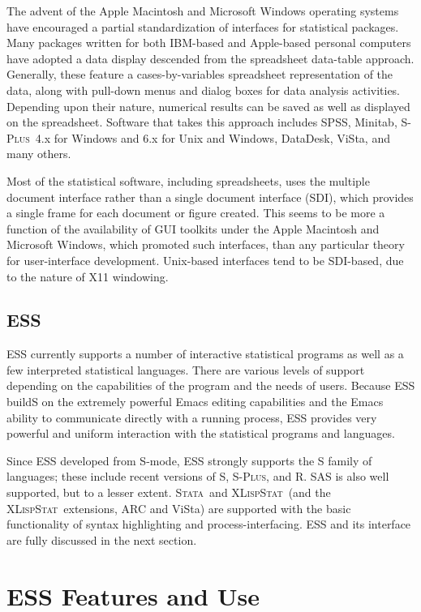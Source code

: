 \documentclass{article}
\newcommand*{\Splus}{\textsc{S-Plus}}
\newcommand*{\XLispStat}{\textsc{XLispStat}}
\newcommand*{\Stata}{\textsc{Stata}}
\begin{document}
The advent of the Apple Macintosh and Microsoft Windows operating
systems have encouraged a partial standardization of interfaces for
statistical packages.  Many packages written for both IBM-based and
Apple-based personal computers have adopted a data display descended
from the spreadsheet data-table approach.  Generally, these feature a
cases-by-variables spreadsheet representation of the data, along with
pull-down menus and dialog boxes for data analysis activities.
Depending upon their nature, numerical results can be saved as well as
displayed on the spreadsheet.  Software that takes this approach
includes SPSS, Minitab, \Splus\ 4.x for Windows and 6.x for Unix and
Windows, DataDesk, ViSta, and many others.

Most of the statistical software, including spreadsheets, uses the
multiple document interface rather than a single document interface
(SDI), which provides a single frame for each document or figure
created.  This seems to be more a function of the availability of GUI
toolkits under the Apple Macintosh and Microsoft Windows, which
promoted such interfaces, than any particular theory for
user-interface development.  Unix-based interfaces tend to be
SDI-based, due to the nature of X11 windowing.

\subsection{ESS}
\label{sec:UI:ESS}

ESS currently supports a number of interactive statistical programs as
well as a few interpreted statistical languages.  There are various
levels of support depending on the capabilities of the program and the
needs of users.  Because ESS buildS on the extremely powerful Emacs
editing capabilities and the Emacs ability to communicate directly
with a running process, ESS provides very powerful and uniform
interaction with the statistical programs and languages.

Since ESS developed from S-mode, ESS strongly supports the S family of
languages; these include recent versions of S, \Splus, and R.  SAS is
also well supported, but to a lesser extent.  \Stata\ and \XLispStat\ 
(and the \XLispStat\ extensions, ARC and ViSta) are supported with the
basic functionality of syntax highlighting and process-interfacing.
ESS and its interface are fully discussed in the next section.

\section{ESS Features and Use}
\label{sec:basic}
\end{document}
